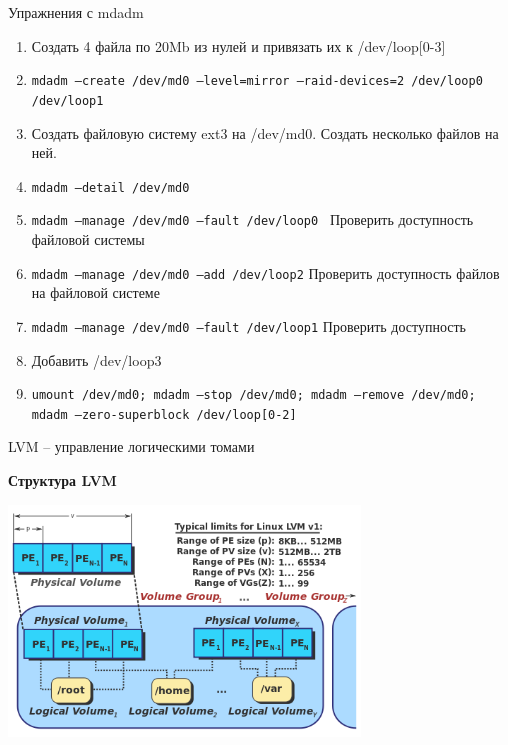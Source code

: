\documentclass[ignorenonframetext, professionalfonts, hyperref={pdftex, unicode}]{beamer}
\begin{document}
\begin{frame}{Упражнения с mdadm}
    \begin{enumerate}
      \item Создать 4 файла по 20Mb из нулей и привязать их к /dev/loop[0-3]
      \item {\tt mdadm --create /dev/md0 --level=mirror --raid-devices=2 /dev/loop0 /dev/loop1}
      \item Создать файловую систему ext3 на /dev/md0. Создать несколько файлов на ней.
      \item {\tt mdadm --detail /dev/md0}
      \item {\tt mdadm --manage /dev/md0 --fault /dev/loop0 } Проверить доступность файловой системы
      \item {\tt mdadm --manage /dev/md0 --add /dev/loop2} Проверить доступность файлов на файловой системе
      \item {\tt mdadm --manage /dev/md0 --fault /dev/loop1} Проверить доступность
      \item Добавить /dev/loop3
      \item {\tt umount /dev/md0; mdadm --stop /dev/md0; mdadm --remove /dev/md0; mdadm --zero-superblock /dev/loop[0-2]}
    \end{enumerate}
\end{frame}

\begin{frame}{LVM -- управление логическими томами}
  \begin{center}
    \textbf{Структура LVM}
  \end{center}
  \includegraphics[width=0.7\textwidth]{LVM1-wiki.png}
\end{frame}
\end{document}
